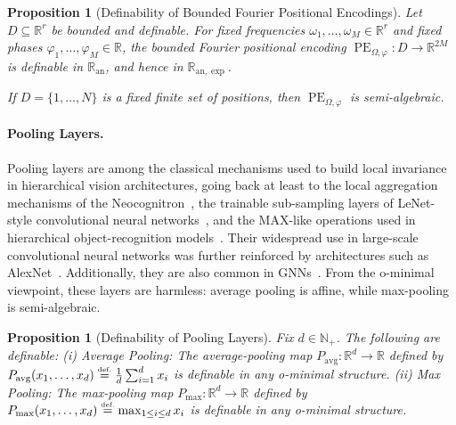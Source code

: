 \documentclass{article}
\newcommand{\eqdef}{\ensuremath{\stackrel{\mbox{\upshape\tiny def.}}{=}}}
\theoremstyle{plain}
\newtheorem{proposition}[theorem]{Proposition}
\theoremstyle{definition}
\theoremstyle{remark}
\theoremstyle{plain}
\numberwithin{thm}{section}
\theoremstyle{definition}
\numberwithin{equation}{section}
\begin{document}
\begin{proposition}[Definability of Bounded Fourier Positional Encodings]
\label{prop:bounded_fourier_positional_encoding_definable}
Let $D\subseteq\mathbb{R}^r$ be bounded and definable.  For fixed frequencies $\omega_1,\dots,\omega_M\in\mathbb{R}^r$ and fixed phases $\varphi_1,\dots,\varphi_M\in\mathbb{R}$, the bounded Fourier positional encoding
$
    \operatorname{PE}_{\Omega,\varphi}:D\to\mathbb{R}^{2M}
$
is definable in $\mathbb{R}_{\mathrm{an}}$, and hence in $\mathbb{R}_{\mathrm{an},\exp}$.

If $D=\{1,\dots,N\}$ is a fixed finite set of positions, then $\operatorname{PE}_{\Omega,\varphi}$ is semi-algebraic.
\end{proposition}

\paragraph{Pooling Layers.}

Pooling layers are among the classical mechanisms used to build local invariance in hierarchical vision architectures, going back at least to the local aggregation mechanisms of the Neocognitron~\citep{fukushima1980neocognitron}, the trainable sub-sampling layers of LeNet-style convolutional neural networks~\citep{lecun1998gradient}, and the MAX-like operations used in hierarchical object-recognition models~\citep{riesenhuber1999hierarchical}. Their widespread use in large-scale convolutional neural networks was further reinforced by architectures such as AlexNet~\citep{krizhevsky2012imagenet}. Additionally, they are also common in GNNs~\citep{bronstein2021geometric}. From the o-minimal viewpoint, these layers are harmless: average pooling is affine, while max-pooling is semi-algebraic.

\begin{proposition}[Definability of Pooling Layers]
\label{prop:pooling_layers_definable}
Fix $d\in\mathbb{N}_+$.  The following are definable: (i) Average Pooling: The average-pooling map $P_{\operatorname{avg}}:\mathbb{R}^d\to\mathbb{R}$ defined by
    $
        P_{\operatorname{avg}}(x_1,\dots,x_d)
        \eqdef
            \frac{1}{d}\sum_{i=1}^d x_i
    $ is definable in any o-minimal structure. (ii) Max Pooling: The max-pooling map $P_{\max}:\mathbb{R}^d\to\mathbb{R}$ defined by
    $
        P_{\max}(x_1,\dots,x_d)
        \eqdef
            \max_{1\le i\le d}x_i
    $ is definable in any o-minimal structure.
\end{proposition}
\end{document}

